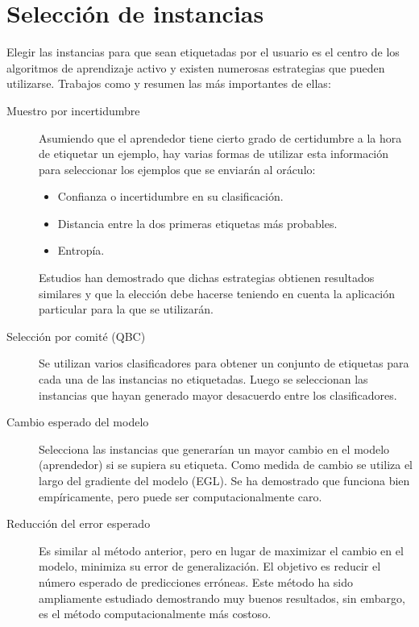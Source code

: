 \section{Selección de instancias}

Elegir las instancias para que sean etiquetadas por el usuario es el centro de los algoritmos de aprendizaje activo y existen numerosas estrategias que pueden utilizarse. Trabajos como \citet{settles_active_learning_survey} y \citet{al-logistic-regresion-schein} resumen las más importantes de ellas:

\begin{description}
    \item[Muestro por incertidumbre] Asumiendo que el aprendedor tiene cierto
    grado de certidumbre a la hora de etiquetar un ejemplo, hay varias formas
    de utilizar esta información para seleccionar los ejemplos que se enviarán
    al oráculo:
    \begin{itemize}
        \item Confianza o incertidumbre en su clasificación.
        \item Distancia entre la dos primeras etiquetas más probables.
        \item Entropía.
    \end{itemize}
    Estudios han demostrado que dichas estrategias obtienen resultados similares
    y que la elección debe hacerse teniendo en cuenta la aplicación particular
    para la que se utilizarán.
    \item[Selección por comité (QBC)] Se utilizan varios clasificadores para obtener
    un conjunto de etiquetas para cada una de las instancias no etiquetadas.
    Luego se seleccionan las instancias que hayan generado mayor desacuerdo
    entre los clasificadores.
    \item[Cambio esperado del modelo] Selecciona las instancias que generarían
    un mayor cambio en el modelo (aprendedor) si se supiera su etiqueta. Como
    medida de cambio se utiliza el largo del gradiente del modelo (EGL). Se ha
    demostrado que funciona bien empíricamente, pero puede ser
    computacionalmente caro.
    \item[Reducción del error esperado] Es similar al método anterior, pero en
    lugar de maximizar el cambio en el modelo, minimiza su error de
    generalización. El objetivo es reducir el número esperado de predicciones
    erróneas. Este método ha sido ampliamente estudiado demostrando muy buenos
    resultados, sin embargo, es el método computacionalmente más costoso.

\end{description}

